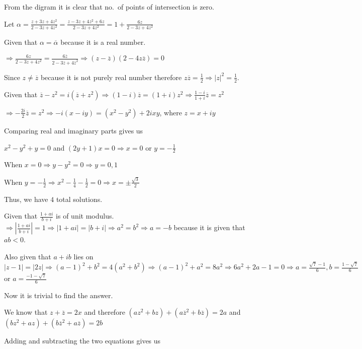   From the digram it is clear that no.\ of points of intersection is zero.
\item Let $\alpha = \frac{z + 3z + 4z^2}{2 - 3z + 4z^2} = \frac{z - 3z + 4z^2 + 6z}{2 - 3z + 4z^2} = 1
  + \frac{6z}{2 - 3z + 4z^2}$

  Given that $\alpha = \overline{\alpha}$ because it is a real number.

  $\Rightarrow \frac{6z}{2 - 3z + 4z^2} = \frac{6\overline{z}}{2 - 3\overline{z} +
    4\overline{z}^2} \Rightarrow (z - \overline{z})(2 - 4z\overline{z}) = 0$

  Since $z\neq \overline{z}$ because it is not purely real number therefore
  $z\overline{z}= \frac{1}{2} \Rightarrow |z|^2 = \frac{1}{2}$.
\item Given that $\overline{z} - z^2 = i(\overline{z} + z^2)\Rightarrow (1 - i)\overline{z} = (1 +
  i)z^2\Rightarrow \frac{1 - i}{1 + i}\overline{z} = z^2$

  $\Rightarrow -\frac{2i}{2}\overline{z} = z^2 \Rightarrow -i(x - iy) = (x^2 - y^2) + 2ixy$, where $z = x +
  iy$

  Comparing real and imaginary parts gives us

  $x^2 - y^2 + y = 0$ and $(2y + 1)x = 0\Rightarrow x =0$ or $y = -\frac{1}{2}$

  When $x = 0 \Rightarrow y - y^2 = 0\Rightarrow y = 0, 1$

  When $y = -\frac{1}{2}\Rightarrow x^2 - \frac{1}{4} - \frac{1}{2} = 0 \Rightarrow x
  = \pm\frac{\sqrt{3}}{2}$

  Thus, we have $4$ total solutions.
\item Given that $\frac{1 + ai}{b + i}$ is of unit modulus. $\Rightarrow \left|\frac{1 + ai}{b + i}\right| =
  1\Rightarrow |1 + ai| = |b + i| \Rightarrow a^2 = b^2 \Rightarrow a = -b$ because it is given that $ab <
  0$.

  Also given that $a + ib$ lies on $|z - 1| = |2z| \Rightarrow (a - 1)^2 + b^2 = 4(a^2 + b^2)\Rightarrow (a
  - 1)^2 + a^2 = 8a^2 \Rightarrow 6a^2 + 2a - 1 = 0\Rightarrow a = \frac{\sqrt{7} - 1}{6}, b = \frac{1
    - \sqrt{7}}{6}$ or $a = \frac{-1 -\sqrt{7}}{6}$

  Now it is trivial to find the answer.
\item We know that $z + \overline{z} = 2x$ and therefore $(az^2 + bz) + (a\overline{z}^2 + b\overline{z}) =
  2a$ and $(bz^2 + az) + (b\overline{z}^2 + a\overline{z}) = 2b$

  Adding and subtracting the two equations gives us

